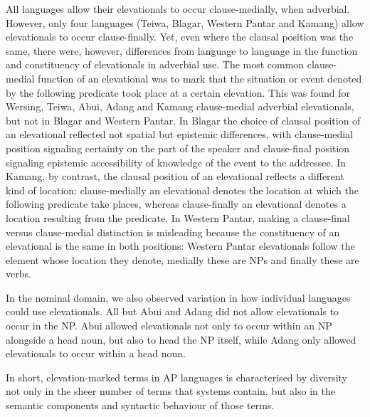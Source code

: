 All languages allow their elevationals to occur clause-medially, when adverbial. However, only four languages (Teiwa, Blagar, Western Pantar and Kamang) allow elevationals to occur clause-finally. Yet, even where the clausal position was the same, there were, however, differences from language to language in the function and constituency of elevationals in adverbial use. The most common clause-medial function of an elevational was to mark that the situation or event denoted by the following predicate took place at a certain elevation. This was found for Wersing, Teiwa, Abui, Adang and Kamang clause-medial adverbial elevationals, but not in Blagar and Western Pantar. In Blagar the choice of clausal position of an elevational reflected not spatial but epistemic differences, with clause-medial position signaling certainty on the part of the speaker and clause-final position signaling epistemic accessibility of knowledge of the event to the addressee. In Kamang, by contrast, the clausal position of an elevational reflects a different kind of location: clause-medially an elevational denotes the location at which the following predicate take places, whereas clause-finally an elevational denotes a location resulting from the predicate. In Western Pantar, making a clause-final versus clause{}-medial distinction is misleading because the constituency of an elevational is the same in both positions: Western Pantar elevationals follow the element whose location they denote, medially these are NPs and finally these are verbs. 

In the nominal domain, we also observed variation in how individual languages could use elevationals. All but Abui and Adang did not allow elevationals to occur in the NP. Abui allowed elevationals not only to occur within an NP alongside a head noun, but also to head the NP itself, while Adang only allowed elevationals to occur within a head noun.

In short, elevation-marked terms in AP languages is characterised by diversity not only in the sheer number of terms that systems contain, but also in the semantic components and syntactic behaviour of those terms. 

